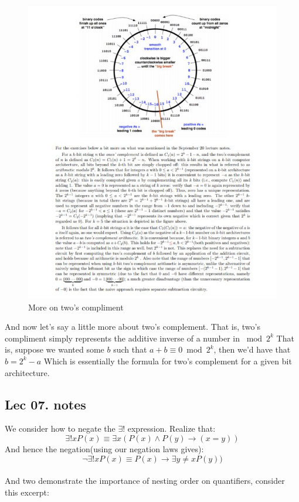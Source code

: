 \documentclass[titlepage]{article}
\theoremstyle{definition}
\numberwithin{equation}{subsection}
\numberwithin{remark}{subsection}
\begin{document}
\begin{figure}[H]
    \centering
    \includegraphics[scale = 1.2]{epflLectureNotes/advancedComputation/figures/twosc.JPG}
    \caption{More on two's compliment}
    \label{fig:my_label}
\end{figure}

And now let's say a little more about two's complement. That is, two's compliment simply represents the additive inverse of a number in $\bmod{2^k}$ That is, suppose we wanted some $b$ such that $a + b \equiv 0 \bmod{2^k}$, then we'd have that $b = 2^{k} - a$ Which is essentially the formula for two's complement for a given bit architecture. 


\subsection{Lec 07. notes}

We consider how to negate the $\exists!$ expression. Realize that:
$$\exists!xP(x) \equiv \exists x(P(x)\land P(y) \rightarrow (x=y))$$
And hence the negation(using our negation laws gives):
$$\neg\exists ! xP(x) \equiv P(x) \rightarrow \exists y \not = xP(y))$$
\\
And two demonstrate the importance of nesting order on quantifiers, consider this excerpt:
\end{document}
